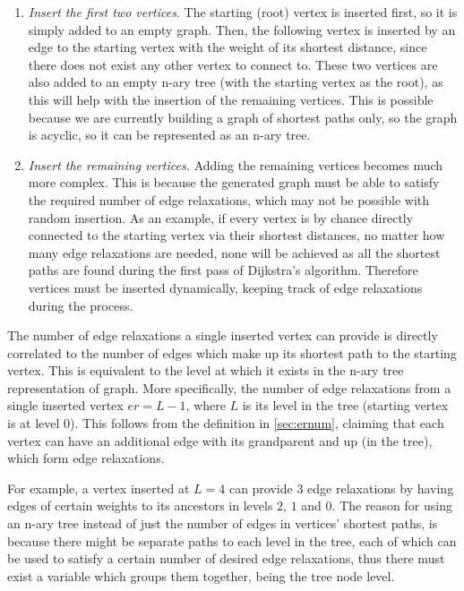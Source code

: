 \documentclass{l4proj}
\begin{document}
\begin{enumerate}[i]
	\item
	\emph{Insert the first two vertices}. The starting (root) vertex is inserted first, so it is simply added to an empty graph. Then, the following vertex is inserted by an edge to the starting vertex with the weight of its shortest distance, since there does not exist any other vertex to connect to. These two vertices are also added to an empty n-ary tree (with the starting vertex as the root), as this will help with the insertion of the remaining vertices. This is possible because we are currently building a graph of shortest paths only, so the graph is acyclic, so it can be represented as an n-ary tree.

	\item
	\emph{Insert the remaining vertices.} Adding the remaining vertices becomes much more complex. This is because the generated graph must be able to satisfy the required number of edge relaxations, which may not be possible with random insertion. As an example, if every vertex is by chance directly connected to the starting vertex via their shortest distances, no matter how many edge relaxations are needed, none will be achieved as all the shortest paths are found during the first pass of Dijkstra's algorithm. Therefore vertices must be inserted dynamically, keeping track of edge relaxations during the process.
\end{enumerate}

The number of edge relaxations a single inserted vertex can provide is directly correlated to the number of edges which make up its shortest path to the starting vertex. This is equivalent to the level at which it exists in the n-ary tree representation of graph. More specifically, the number of edge relaxations from a single inserted vertex $er = L-1$, where $L$ is its level in the tree (starting vertex is at level $0$). This follows from the definition in \autoref{sec:ernum}, claiming that each vertex can have an additional edge with its grandparent and up (in the tree), which form edge relaxations. 

For example, a vertex inserted at $L=4$ can provide $3$ edge relaxations by having edges of certain weights to its ancestors in levels $2$, $1$ and $0$. The reason for using an n-ary tree instead of just the number of edges in vertices' shortest paths, is because there might be separate paths to each level in the tree, each of which can be used to satisfy a certain number of desired edge relaxations, thus there must exist a variable which groups them together, being the tree node level.
\end{document}
